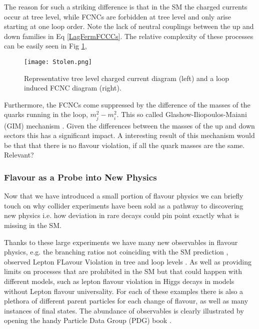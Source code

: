 \setlength{\tabcolsep}{6pt} %
\renewcommand{\arraystretch}{1} %

The reason for such a striking difference is that in the SM the charged currents occur at tree level, while FCNCs are forbidden at tree level and only arise starting at one loop order. Note the lack of neutral couplings between the up and down families in Eq \ref{LagFermFCCCs}. The relative complexity of these processes can be easily seen in Fig \ref{fig:Flavour_D_1},
%
\begin{figure}[H]
	\centering
	\texttt{[image: Stolen.png]}
	\caption{Representative tree level charged current diagram (left) and a loop induced FCNC diagram (right).}
	\label{fig:Flavour_D_1}
\end{figure}
%
%
Furthermore, the FCNCs come suppressed by the difference of the masses of the quarks running in the loop, $m^2_j-m^2_i$. This so called Glashow-Iliopoulos-Maiani (GIM) mechanism \cite{glashow1970weak}. Given the differences between the masses of the up and down sectors this has a significant impact. 
%
A interesting result of this mechanism would be that that there is no flavour violation, if all the quark masses are the same. { \color{red} Relevant? }

\subsubsection{Flavour as a Probe into New Physics}

Now that we have introduced a small portion of flavour physics we can briefly touch on why collider experiments have been sold as a pathway to discovering new physics i.e. how deviation in rare decays could pin point exactly what is missing in the SM. 

Thanks to these large experiments we have many new observables in flavour physics, e.g. the branching ratios not coinciding with the SM prediction \cite{CasteloBranco2014}, observed Lepton FLavour Violation in tree and loop levels \cite{Graverini2019}.
%
As well as providing limits on processes that are prohibited in the SM but that could happen with different models, such as lepton flavour violation in Higgs decays \cite{Sirunyan_2018} in models without Lepton flavour universality. 
%
For each of these examples there is also a plethora of different parent particles for each change of flavour, as well as many instances of final states. 
%
The abundance of observables is clearly illustrated by opening the handy Particle Data Group (PDG) book \cite{Tanabashi2018}. 

